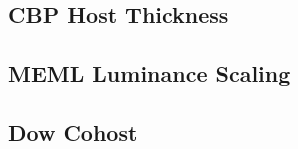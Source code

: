 \documentclass[../thesis.tex]{subfiles}
\begin{document}
\subsection{CBP Host Thickness}

\subsection{MEML Luminance Scaling}


\subsection{Dow Cohost}



\end{document}
